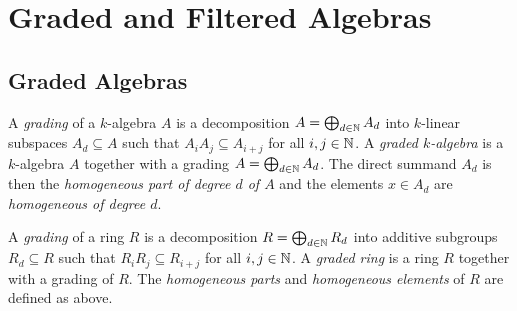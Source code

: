 \section{Graded and Filtered Algebras}





\subsection{Graded Algebras}

\begin{definition}
  \label{definition: gradings and graded algebras}
  A \emph{grading} of a $k$-algebra $A$ is a decomposition $A = \bigoplus_{d \in \mathbb{N}} A_d$ into $k$-linear subspaces $A_d \subseteq A$ such that $A_i A_j \subseteq A_{i+j}$ for all $i,j \in \mathbb{N}$.
  A \emph{graded $k$-algebra} is a $k$-algebra $A$ together with a grading $A = \bigoplus_{d \in \mathbb{N}} A_d$.
  The direct summand $A_d$ is then the \emph{homogeneous part of degree $d$ of $A$} and the elements $x \in A_d$ are \emph{homogeneous of degree $d$}.
  
  A \emph{grading} of a ring $R$ is a decomposition $R = \bigoplus_{d \in \mathbb{N}} R_d$ into additive subgroups $R_d \subseteq R$ such that $R_i R_j \subseteq R_{i+j}$ for all $i,j \in \mathbb{N}$.
  A \emph{graded ring} is a ring $R$ together with a grading of $R$.
  The \emph{homogeneous parts} and \emph{homogeneous elements} of $R$ are defined as above.
\end{definition}

